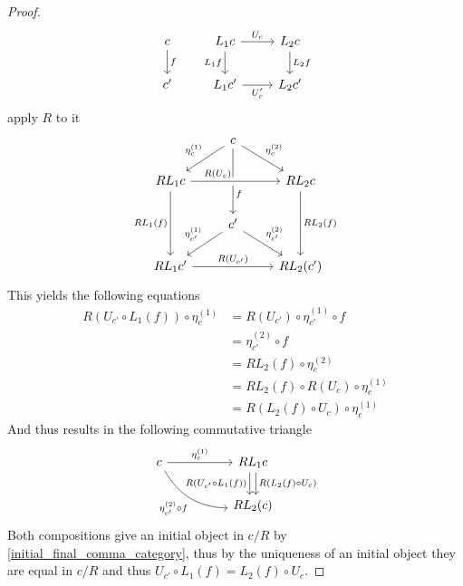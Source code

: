 \begin{proof}
    \[
    \begin{tikzcd}
        c 
        \arrow[d, "f"]
        &
        L_1c
        \arrow[r, "U_c"]
        \arrow[d, "L_1f"']
        &
        L_2c
        \arrow[d, "L_2f"]
        \\
        c'
        &
        L_1c'
        \arrow[r, "U_c'"']
        &
        L_2c'
    \end{tikzcd}
    \]
    apply $R$ to it 
    \[
    \begin{tikzcd}
        &
        c
        \arrow[dl, "\eta^{(1)}_c"']
        \arrow[dr, "\eta^{(2)}_c"]
        \arrow[dd, "f", pos=0.7]
        &
        \\
        RL_1c
        \arrow[rr, crossing over, "R(U_c)", pos=0.3]
        \arrow[dd, "RL_1(f)"']
        &
        &
        RL_2c
        \arrow[dd,"RL_2(f)"]
        \\
        &
        c'
        \arrow[ld, "\eta_{c'}^{(1)}"']
        \arrow[rd, "\eta_{c'}^{(2)}"]
        &
        \\
        RL_1c'
        \arrow[rr, "R(U_{c'})"]
        &
        &
        RL_2(c')
    \end{tikzcd}
    \]
    This yields the following equations
    \begin{align}
        R(U_{c'} \circ L_1(f)) \circ \eta^{(1)}_c
        &= R (U_{c'}) \circ \eta_{c'}^{(1)} \circ f
        \\
        &= \eta_{c'}^{(2)} \circ f
        \\
        &=RL_2(f) \circ \eta_c^{(2)}
        \\
        &=RL_2(f) \circ R(U_c) \circ \eta_c^{(1)}
        \\
        &=R(L_2(f) \circ U_c) \circ \eta_c^{(1)}
    \end{align}
    And thus results in the following commutative triangle 
    \[
    \begin{tikzcd}
        c 
        \arrow[rr, "\eta_c^{(1)}"]
        \ar[rrd, bend right, "\eta_{c'}^{(2)} \circ f"']
        &&
        RL_1c
        \dar[shift left, "R(L_2(f) \circ U_c)"]
        \dar[shift right, "R(U_{c'} \circ L_1(f))"']
        \\
        &&
        RL_2(c)
    \end{tikzcd}
    \]
    Both compositions give an initial object in $c/R$ by \cref{initial_final_comma_category}, thus by the uniqueness of an initial object they are equal in $c/R$ and thus $U_{c'} \circ L_1(f)=L_2(f) \circ U_c$.
\end{proof}

